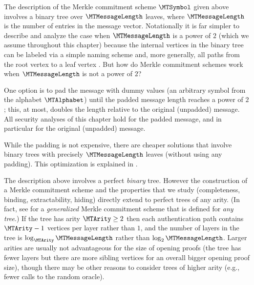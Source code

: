\begin{remark}
\label{remark:mt-any-message-length}
The description of the Merkle commitment scheme $\MTSymbol$ given above involves a binary tree over $\MTMessageLength$ leaves, where $\MTMessageLength$ is the number of entries in the message vector. Notationally it is far simpler to describe and analyze the case when $\MTMessageLength$ is a power of $2$ (which we assume throughout this chapter) because the internal vertices in the binary tree can be labeled via a simple naming scheme and, more generally, all paths from the root vertex to a leaf vertex . But how do Merkle commitment schemes work when $\MTMessageLength$ is not a power of $2$?

One option is to pad the message with dummy values (an arbitrary symbol from the alphabet $\MTAlphabet$) until the padded message length reaches a power of $2$; this, at most, doubles the length relative to the original (unpadded) message. All security analyses of this chapter hold for the padded message, and in particular for the original (unpadded) message.

While the padding is not expensive, there are cheaper solutions that involve binary trees with precisely $\MTMessageLength$ leaves (without using any padding). This optimization is explained in .
\end{remark}

\begin{remark}
\label{remark:other-arities}
The description above involves a perfect \emph{binary} tree. However the construction of a Merkle commitment scheme and the properties that we study (completeness, binding, extractability, hiding) directly extend to perfect trees of any arity. (In fact, see  for a \emph{generalized} Merkle commitment scheme that is defined for \emph{any tree}.)  If the tree has arity $\MTArity \geq 2$ then each authentication path contains $\MTArity-1$ vertices per layer rather than $1$, and the number of layers in the tree is $\log_{\MTArity} \MTMessageLength$ rather than $\log_{2} \MTMessageLength$. Larger arities are usually not advantageous for the size of opening proofs (the tree has fewer layers but there are more sibling vertices for an overall bigger opening proof size), though there may be other reasons to consider trees of higher arity (e.g., fewer calls to the random oracle).
\end{remark}

